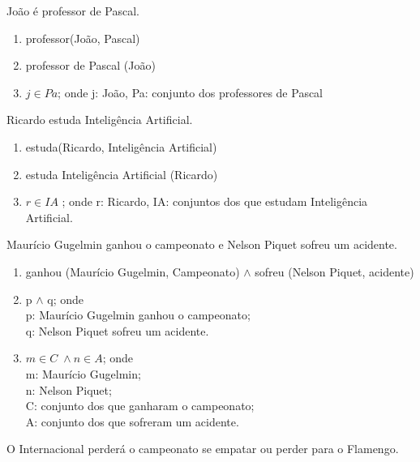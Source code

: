\bigskip
\begin{exemplo} João é professor de Pascal.
\end{exemplo}

\begin{enumerate}[label=(\roman*)]
    \item professor(João, Pascal)
    \item professor de Pascal (João)
    \item $j \in Pa$; onde j: João, Pa: conjunto dos professores de Pascal
\end{enumerate}

\bigskip
\begin{exemplo} Ricardo estuda Inteligência Artificial.
 \end{exemplo}

\begin{enumerate}[label=(\roman*)]
    \item estuda(Ricardo, Inteligência Artificial)
    \item estuda Inteligência Artificial (Ricardo)
    \item $r \in IA$ ; onde r: Ricardo, IA: conjuntos dos que estudam Inteligência Artificial.
\end{enumerate}

\bigskip
\begin{exemplo} Maurício Gugelmin ganhou o campeonato e Nelson Piquet sofreu um acidente.
\end{exemplo}

\begin{enumerate}[label=(\roman*)]
    \item ganhou (Maurício Gugelmin, Campeonato) $\wedge$ sofreu (Nelson Piquet, acidente)
    \item p $\wedge$ q; onde\\
    p: Maurício Gugelmin ganhou o campeonato;\\
    q: Nelson Piquet sofreu um acidente.
    \item $m \in C \; \wedge n \in A$; onde\\
    m: Maurício Gugelmin;\\
    n: Nelson Piquet;\\
    C: conjunto dos que ganharam o campeonato;\\
    A: conjunto dos que sofreram um acidente.
\end{enumerate}

\bigskip
\begin{exemplo} O Internacional perderá o campeonato se empatar ou perder para o Flamengo.
\end{exemplo}

